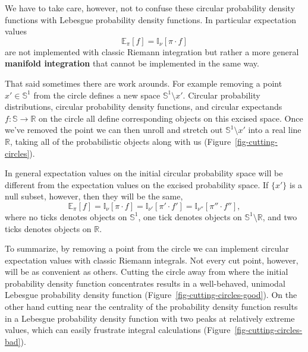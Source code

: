 \documentclass[
  letterpaper,
  DIV=11,
  numbers=noendperiod]{scrartcl}
\begin{document}
We have to take care, however, not to confuse these circular probability
density functions with Lebesgue probability density functions. In
particular expectation values \[
\mathbb{E}_{\pi}[f] = \mathbb{I}_{\nu}[\pi \cdot f]
\] are not implemented with classic Riemann integration but rather a
more general \textbf{manifold integration} that cannot be implemented in
the same way.

That said sometimes there are work arounds. For example removing a point
\(x' \in \mathbb{S}^{1}\) from the circle defines a new space
\(\mathbb{S}^{1} \setminus x'\). Circular probability distributions,
circular probability density functions, and circular expectands
\(f : \mathbb{S} \rightarrow \mathbb{R}\) on the circle all define
corresponding objects on this excised space. Once we've removed the
point we can then unroll and stretch out \(\mathbb{S}^{1} \setminus x'\)
into a real line \(\mathbb{R}\), taking all of the probabilistic objects
along with us (Figure~\ref{fig-cutting-circles}).

In general expectation values on the initial circular probability space
will be different from the expectation values on the excised probability
space. If \(\{ x' \}\) is a null subset, however, then they will be the
same, \[
\mathbb{E}_{\pi}[f]
= \mathbb{I}_{\nu}[\pi \cdot f]
= \mathbb{I}_{\nu'}[\pi' \cdot f']
= \mathbb{I}_{\nu''}[\pi'' \cdot f''],
\] where no ticks denotes objects on \(\mathbb{S}^{1}\), one tick
denotes objects on \(\mathbb{S}^{1} \setminus \mathbb{R}\), and two
ticks denotes objects on \(\mathbb{R}\).

To summarize, by removing a point from the circle we can implement
circular expectation values with classic Riemann integrals. Not every
cut point, however, will be as convenient as others. Cutting the circle
away from where the initial probability density function concentrates
results in a well-behaved, unimodal Lebesgue probability density
function (Figure~\ref{fig-cutting-circles-good}). On the other hand
cutting near the centrality of the probability density function results
in a Lebesgue probability density function with two peaks at relatively
extreme values, which can easily frustrate integral calculations
(Figure~\ref{fig-cutting-circles-bad}).
\end{document}
